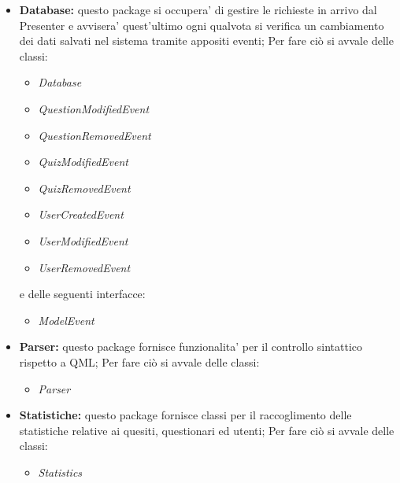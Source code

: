 \documentclass[a4paper,11pt]{article}
\begin{document}
	\begin{itemize}
		\item\textbf{Database:} questo package si occupera' di gestire le richieste in arrivo dal Presenter e avvisera' quest'ultimo ogni qualvota si verifica un cambiamento dei dati salvati nel sistema tramite appositi eventi; Per fare ciò si avvale delle classi:
			\begin{itemize}
				\item\textit{Database}
				\item\textit{QuestionModifiedEvent}
				\item\textit{QuestionRemovedEvent}
				\item\textit{QuizModifiedEvent}
				\item\textit{QuizRemovedEvent}
				\item\textit{UserCreatedEvent}
				\item\textit{UserModifiedEvent}
				\item\textit{UserRemovedEvent}
			\end{itemize}
				e delle seguenti interfacce:
			\begin{itemize}
				\item\textit{ModelEvent}
			\end{itemize}
		\item\textbf{Parser:} questo package fornisce funzionalita' per il controllo sintattico rispetto a QML; Per fare ciò si avvale delle classi:
			\begin{itemize}
				\item\textit{Parser}
			\end{itemize}
		\item\textbf{Statistiche:} questo package fornisce classi per il raccoglimento delle statistiche relative ai quesiti, questionari ed utenti; Per fare ciò si avvale delle classi:
			\begin{itemize}
				\item\textit{Statistics}
			\end{itemize}
		\end{itemize}
		\newpage
	
\end{document}
